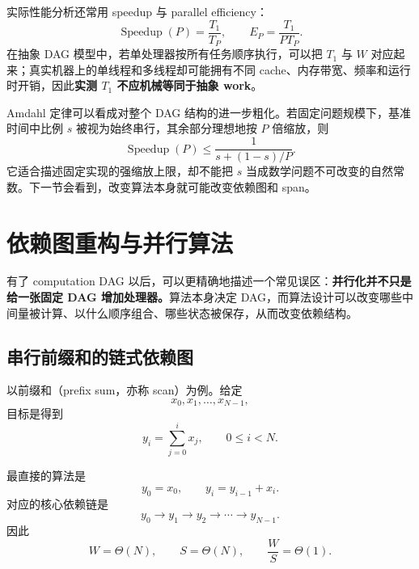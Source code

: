 实际性能分析还常用 speedup 与 parallel efficiency：
\begin{equation}
\operatorname{Speedup}(P)=\frac{T_1}{T_P},
\qquad
E_P=\frac{T_1}{P T_P}.
\end{equation}
在抽象 DAG 模型中，若单处理器按所有任务顺序执行，可以把 $T_1$ 与 $W$ 对应起来；真实机器上的单线程和多线程却可能拥有不同 cache、内存带宽、频率和运行时开销，因此\textbf{实测 $T_1$ 不应机械等同于抽象 work}。

Amdahl 定律可以看成对整个 DAG 结构的进一步粗化。若固定问题规模下，基准时间中比例 $s$ 被视为始终串行，其余部分理想地按 $P$ 倍缩放，则
\begin{equation}
\operatorname{Speedup}(P)
\le
\frac{1}{s+(1-s)/P}.
\end{equation}
它适合描述固定实现的强缩放上限，却不能把 $s$ 当成数学问题不可改变的自然常数。下一节会看到，改变算法本身就可能改变依赖图和 span。

\section{依赖图重构与并行算法}

有了 computation DAG 以后，可以更精确地描述一个常见误区：\textbf{并行化并不只是给一张固定 DAG 增加处理器。}算法本身决定 DAG，而算法设计可以改变哪些中间量被计算、以什么顺序组合、哪些状态被保存，从而改变依赖结构。

\subsection{串行前缀和的链式依赖图}

以前缀和（prefix sum，亦称 scan）为例。给定
\begin{equation}
x_0,x_1,\ldots,x_{N-1},
\end{equation}
目标是得到
\begin{equation}
y_i=\sum_{j=0}^{i}x_j,
\qquad
0\le i<N.
\label{eq:parallel-prefix-target}
\end{equation}

最直接的算法是
\begin{equation}
y_0=x_0,
\qquad
y_i=y_{i-1}+x_i.
\label{eq:parallel-prefix-serial}
\end{equation}
对应的核心依赖链是
\begin{equation}
y_0
\rightarrow
y_1
\rightarrow
y_2
\rightarrow\cdots\rightarrow
y_{N-1}.
\label{eq:parallel-prefix-chain}
\end{equation}
因此
\begin{equation}
W=\Theta(N),
\qquad
S=\Theta(N),
\qquad
\frac{W}{S}=\Theta(1).
\end{equation}

